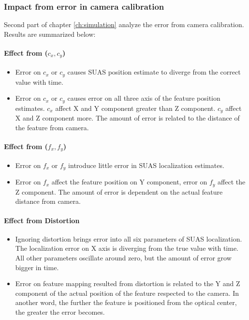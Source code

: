\subsubsection{Impact from error in camera calibration}
Second part of chapter \ref{ch:simulation} analyze the error from
camera calibration. Results are summarized below:

\paragraph{Effect from ($c_x, c_y$)}
\begin{itemize}
  \item Error on $c_x$ or $c_y$ causes SUAS position estimate to
  diverge from the correct value with time.
  \item Error on $c_x$ or $c_y$ causes error on all three axis of the
  feature position estimates. $c_x$ affect X and Y component greater
  than Z component. $c_y$ affect X and Z component more. The amount of
  error is related to the distance of the feature from camera. 
\end{itemize}

\paragraph{Effect from ($f_x, f_y$)}
\begin{itemize}
  \item Error on $f_x$ or $f_y$ introduce little error in SUAS
  localization estimates. 
  \item Error on $f_x$ affect the feature position on Y component,
  error on $f_y$ affect the Z component. The amount of error is
  dependent on the actual feature distance from camera. 
\end{itemize}

\paragraph{Effect from Distortion}
\begin{itemize}
  \item Ignoring distortion brings error into all six parameters of
  SUAS localization. The localization error on X axis is diverging
  from the true value with time. All other parameters oscillate around
  zero, but the amount of error grow bigger in time. 
  \item Error on feature mapping resulted from distortion is related
  to the Y and Z component of the actual position of the feature
  respected to the camera. In another word, the further the feature is
  positioned from the optical center, the greater the error becomes. 
\end{itemize}

